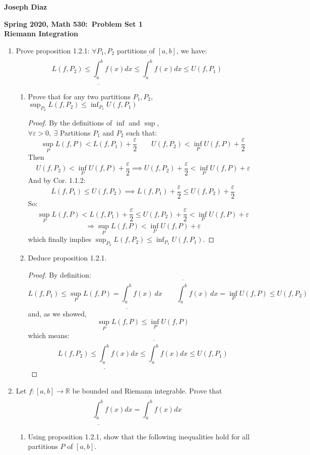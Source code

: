 \documentclass{article}
\newcommand{\vep}{\varepsilon}
\newcommand{\R}{\mathbb{R}}
\newcommand{\<}{\langle}
\renewcommand{\>}{\rangle}
\newcommand{\lowint}[2]{\underline{\int_{#1}^{#2}}}
\newcommand{\upint}[2]{\overline{\int_{#1}^{#2}}}
\begin{document}
\textbf{Joseph Diaz} \hfill 
\begin{center}
    \textbf{Spring 2020, Math 530:\ Problem Set 1} \\
    \textbf{Riemann Integration} \\
\end{center}

\begin{enumerate}[(E1)]
    \item Prove proposition 1.2.1: $\forall P_1,P_2$ partitions of $[a,b]$, we have:
    $$
    L(f,P_2) \leq \lowint{a}{b} f(x)dx \leq \upint{a}{b} f(x)dx \leq U(f,P_1)
    $$
    \begin{enumerate}
    \item Prove that for any two partitions $P_1,P_2$, $\sup_{P_2} L(f,P_2) \leq \inf_{P_1}U(f,P_1)$
    \begin{proof}
    By the definitions of $\inf$ and $\sup$,\\
    $\forall \vep > 0,\ \exists$ Partitions $P_1$ and $P_2$ such that:
    $$
    \sup_P L(f, P) < L(f,P_1) + \frac{\vep}{2} \qquad U(f, P_2) < \inf_P U(f, P) + \frac{\vep}{2}
    $$
    Then
    $$U(f, P_2) < \inf_P U(f, P) + \frac{\vep}{2} \implies U(f, P_2) + \frac{\vep}{2} < \inf_P U(f, P) + \vep$$
    And by Cor. 1.1.2:
    $$L(f, P_1) \leq U(f, P_2) \implies L(f, P_1) + \frac{\vep}{2} \leq U(f, P_2) + \frac{\vep}{2}$$
    So:
    $$
    \sup_P L(f, P) < L(f,P_1) + \frac{\vep}{2} \leq U(f, P_2) + \frac{\vep}{2} < \inf_P U(f, P) + \vep$$
    $$
    \Rightarrow \sup_P L(f, P) < \inf_P U(f, P) + \vep
    $$
    which finally implies $\sup_{P_2} L(f,P_2) \leq \inf_{P_1}U(f,P_1)$.
    \end{proof}
    \item Deduce proposition 1.2.1.
    \begin{proof}     
    By definition:
    $$L(f, P_1) \leq \sup_P L(f, P) = \lowint{a}{b}f(x)\ dx \qquad \upint{a}{b}f(x)\ dx = \inf_P U(f, P) \leq U(f, P_2)$$
    and, as we showed, 
    $$\sup_{P} L(f,P) \leq \inf_{P}U(f,P)$$
    which means:
    $$L(f,P_2) \leq \lowint{a}{b} f(x)dx \leq \upint{a}{b} f(x)dx \leq U(f,P_1)$$
    \end{proof}
    \end{enumerate}
    \item Let $f : [a,b] \to \R$ be bounded and Riemann integrable. Prove that 
    $$\lowint{a}{b}f(x)dx = \upint{a}{b}f(x)dx$$
    \begin{enumerate}
    \item
    Using proposition 1.2.1, show that the following inequalities hold for all partitions $P$ of $[a,b]$.

\end{enumerate}
\end{enumerate}
\end{document}
